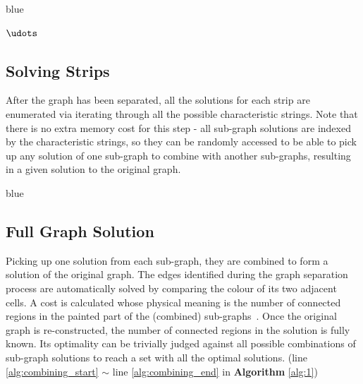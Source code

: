 \documentclass[journal]{IEEEtran}
\begin{document}
\begin{color}{blue}
\begin{algorithm}[t]
\begin{algorithmic}[1]
	\EndFor
\State $\udots$
\EndFor%
    \end{algorithmic}  
\end{algorithm}

\end{color}

\subsection{Solving Strips}
After the graph has been separated, all the solutions for each strip are enumerated via iterating through all the possible characteristic strings. 
Note that there is no extra memory cost for this step - all sub-graph solutions are indexed by the characteristic strings, so they can be randomly accessed 
to be able to pick up any solution of one sub-graph to combine with another sub-graphs, resulting in a given solution to the original graph. 

\begin{color}{blue}
\subsection{Full Graph Solution}
\end{color}
Picking up one solution from each sub-graph, they are combined to form a solution of the original graph. 
The edges identified during the graph separation process are automatically solved by comparing the colour of its two adjacent cells. 
A cost is calculated whose physical meaning is the number of connected regions in the painted part of the (combined) sub-graphs~\cite{Yang2020Cellular}. 
Once the original graph is re-constructed, the number of connected regions in the solution is fully known. Its optimality can be trivially judged against all possible combinations of sub-graph solutions to reach a set with all the optimal solutions. (line \ref{alg:combining_start} $\sim$ line \ref{alg:combining_end} in \textbf{Algorithm} \ref{alg:1})
\end{document}
